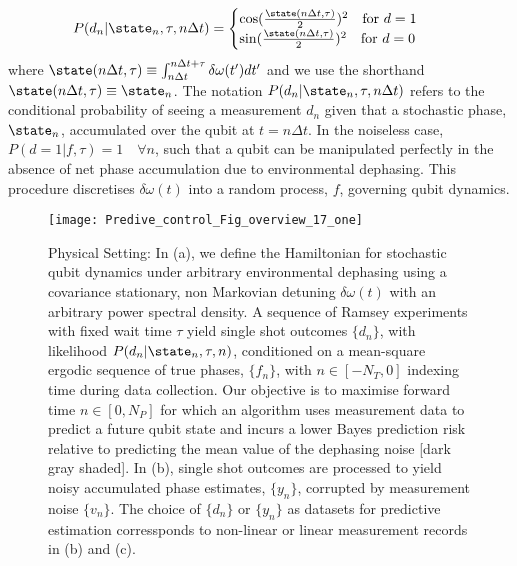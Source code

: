 \begin{align}
P(d_n | \state_n, \tau, n \Delta t) &= \begin{cases} \cos(\frac{\state(n \Delta t,\tau)}{2})^2 \quad \text{for $d=1$} \\   \sin(\frac{\state(n \Delta t,\tau)}{2})^2  \quad \text{for $ d=0$} \end{cases} \label{eqn:main:likelihood}
\end{align}
where  $ \state(n \Delta t,\tau) \equiv \int_{n \Delta t}^{n \Delta t +\tau} \delta \omega(t') dt'$ and we use the shorthand $\state(n \Delta t ,\tau) \equiv \state_n$. The notation $P(d_n | \state_n, \tau, n \Delta t)$ refers to the conditional probability of seeing a measurement $d_n$ given that a stochastic phase, $\state_n$, accumulated over the qubit at $t = n \Delta t$. In the noiseless case, $P(d=1| f, \tau) = 1 \quad \forall n $, such that a qubit can be manipulated perfectly in the absence of net phase accumulation due to environmental dephasing. This procedure discretises $\delta \omega(t)$ into a random process, $f$, governing qubit dynamics. 
\\
\begin{figure}[h!]
    \texttt{[image: Predive\_control\_Fig\_overview\_17\_one]} 
    \caption{ \label{fig:main:Predive_control_Fig_overview_17_one} Physical Setting: In (a), we define the Hamiltonian for stochastic qubit dynamics under arbitrary environmental dephasing using a covariance stationary, non Markovian detuning $\delta \omega(t)$ with an arbitrary power spectral density. A sequence of Ramsey experiments with fixed wait time $\tau$ yield single shot outcomes $\{ d_n \}$, with likelihood $P(d_n|\state_n, \tau,n)$,  conditioned on a mean-square ergodic sequence of true phases, $\{ f_n\}$, with $n \in [-N_T, 0]$ indexing time during data collection. Our objective is to maximise forward time $n \in [0, N_P]$ for which an algorithm uses measurement data to predict a future qubit state and incurs a lower Bayes prediction risk relative to predicting the mean value of the dephasing noise [dark gray shaded]. In (b), single shot outcomes are processed to yield noisy accumulated phase estimates, $\{ y_n\}$, corrupted by measurement noise $\{v_n\}$. The choice of $\{d_n\}$ or $\{y_n\}$ as datasets for predictive estimation corressponds to non-linear or linear measurement records in (b) and (c).}
\end{figure} 

